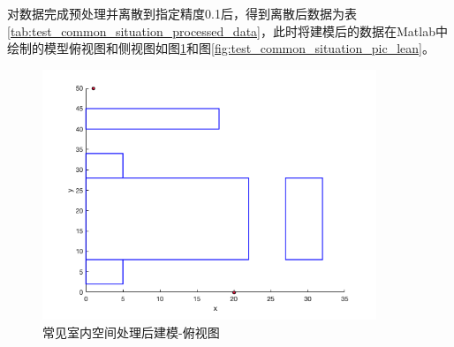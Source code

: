 对数据完成预处理并离散到指定精度0.1后，得到离散后数据为表\ref{tab:test_common_situation_processed_data}，此时将建模后的数据在Matlab中绘制的模型俯视图和侧视图如图\ref{fig:test_common_situation_pic_top}和图\ref{fig:test_common_situation_pic_lean}。
\begin{table}[htb]
    \centering
    \caption{常见室内空间处理后数据}
    \label{tab:test_common_situation_processed_data}
\end{table}
\begin{figure}[htb]
    \centering
    \caption{常见室内空间处理后建模-俯视图}
    \label{fig:test_common_situation_pic_top}
    \includegraphics[width=10cm]{figures/test_common_situation_pic_top.png}
\end{figure}
